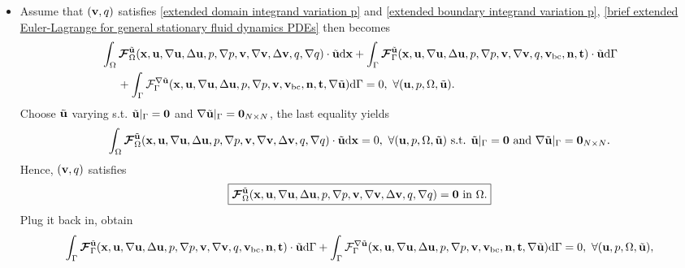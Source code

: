 \documentclass[oneside]{book}
\numberwithin{equation}{section}
\begin{document}
\begin{itemize}[leftmargin=0in]
\begin{itemize}
        \item Assume that $({\bf v},q)$ satisfies \eqref{extended domain integrand variation p} and \eqref{extended boundary integrand variation p}, \eqref{brief extended Euler-Lagrange for general stationary fluid dynamics PDEs} then becomes
        \begin{align*}
            &\int_\Omega \boldsymbol{\mathcal{F}}_\Omega^{\tilde{\bf u}}({\bf x},{\bf u},\nabla{\bf u},\Delta{\bf u},p,\nabla p,{\bf v},\nabla{\bf v},\Delta{\bf v},q,\nabla q)\cdot\tilde{\bf u}{\rm d}{\bf x} + \int_\Gamma \boldsymbol{\mathcal{F}}_\Gamma^{\tilde{\bf u}}({\bf x},{\bf u},\nabla{\bf u},\Delta{\bf u},p,\nabla p,{\bf v},\nabla{\bf v},q,{\bf v}_{\rm bc},{\bf n},{\bf t})\cdot\tilde{\bf u}{\rm d}\Gamma\\
            &\hspace{5mm}+ \int_\Gamma \mathcal{F}_\Gamma^{\nabla\tilde{\bf u}}({\bf x},{\bf u},\nabla{\bf u},\Delta{\bf u},p,\nabla p,{\bf v},{\bf v}_{\rm bc},{\bf n},{\bf t},\nabla\tilde{\bf u}){\rm d}\Gamma = 0,\ \forall({\bf u},p,\Omega,\tilde{\bf u}).
        \end{align*}
        Choose $\tilde{\bf u}$ varying s.t. $\tilde{\bf u}|_\Gamma = {\bf 0}$ and $\nabla\tilde{\bf u}|_\Gamma = {\bf 0}_{N\times N}$, the last equality yields
        \begin{align*}
            \int_\Omega \boldsymbol{\mathcal{F}}_\Omega^{\tilde{\bf u}}({\bf x},{\bf u},\nabla{\bf u},\Delta{\bf u},p,\nabla p,{\bf v},\nabla{\bf v},\Delta{\bf v},q,\nabla q)\cdot\tilde{\bf u}{\rm d}{\bf x} = 0,\ \forall({\bf u},p,\Omega,\tilde{\bf u}) \mbox{ s.t. } \tilde{\bf u}|_\Gamma = {\bf 0} \mbox{ and } \nabla\tilde{\bf u}|_\Gamma = {\bf 0}_{N\times N}.
        \end{align*}
        Hence, $({\bf v},q)$ satisfies
        \begin{align*}
            \boxed{\boldsymbol{\mathcal{F}}_\Omega^{\tilde{\bf u}}({\bf x},{\bf u},\nabla{\bf u},\Delta{\bf u},p,\nabla p,{\bf v},\nabla{\bf v},\Delta{\bf v},q,\nabla q) = {\bf 0} \mbox{ in } \Omega.}
        \end{align*}
        Plug it back in, obtain
        \begin{align*}
            \int_\Gamma \boldsymbol{\mathcal{F}}_\Gamma^{\tilde{\bf u}}({\bf x},{\bf u},\nabla{\bf u},\Delta{\bf u},p,\nabla p,{\bf v},\nabla{\bf v},q,{\bf v}_{\rm bc},{\bf n},{\bf t})\cdot\tilde{\bf u}{\rm d}\Gamma + \int_\Gamma \mathcal{F}_\Gamma^{\nabla\tilde{\bf u}}({\bf x},{\bf u},\nabla{\bf u},\Delta{\bf u},p,\nabla p,{\bf v},{\bf v}_{\rm bc},{\bf n},{\bf t},\nabla\tilde{\bf u}){\rm d}\Gamma = 0,\ \forall({\bf u},p,\Omega,\tilde{\bf u}),

\end{align*}
\end{itemize}
\end{itemize}
\end{document}
